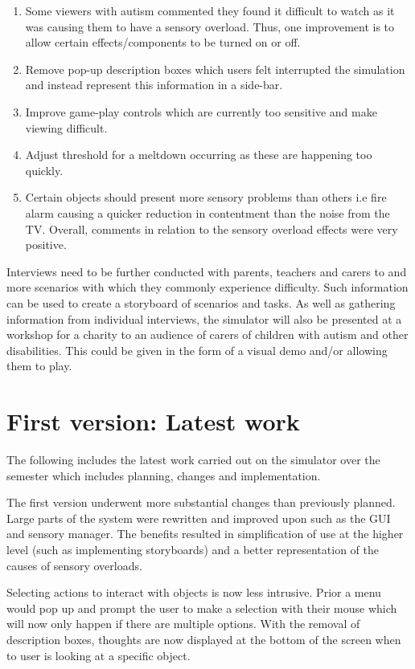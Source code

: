 \documentclass[11pt]{report}
\begin{document}
\begin{enumerate}
\item Some viewers with autism commented they found it difficult to watch as it was causing them to have a sensory overload. Thus, one improvement is to allow certain effects/components to be turned on or off.
\item Remove pop-up description boxes which users felt interrupted the simulation and instead represent this information in a side-bar.
\item Improve game-play controls which are currently too sensitive and make viewing difficult.
\item Adjust threshold for a meltdown occurring as these are happening too quickly.
\item Certain objects should present more sensory problems than others i.e fire alarm causing a quicker reduction in contentment than the noise from the TV. Overall, comments in relation to the sensory overload effects were very positive.
\end{enumerate}

Interviews need to be further conducted with parents, teachers and carers to and more scenarios with which they commonly experience difficulty. Such information can be used to create a storyboard of scenarios and tasks. As
well as gathering information from individual interviews, the simulator will also be presented at a workshop for a charity to an audience of carers of children with autism and other disabilities. This could be given in the form of a visual demo and/or allowing them to play.

\chapter{First version: Latest work}
The following includes the latest work carried out on the simulator over the semester which includes planning, changes and implementation. 

The first version underwent more substantial changes than previously planned. Large parts of the system were rewritten and improved upon such as the GUI and sensory manager. The benefits resulted in simplification of use at the higher level (such as implementing storyboards) and a better representation of the causes of sensory overloads.

Selecting actions to interact with objects is now less intrusive. Prior a menu would pop up and prompt the user to make a selection with their mouse which will now only happen if there are multiple options. With the removal of description boxes, thoughts are now displayed at the bottom of the screen when to user is looking at a specific object.
\end{document}
